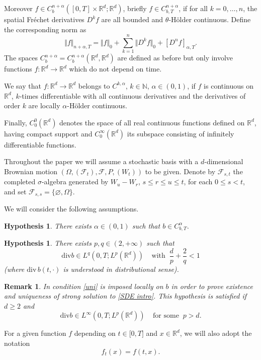 \documentclass[a4paper,10pt]{article}
\newtheorem{remark}[theorem]{Remark}
\newtheorem{hypothesis}[theorem]{Hypothesis}
\begin{document}
Moreover $f\in C_{b}^{n+{\alpha}}([0,T]\times{\mathbb{R}}^{d};{\mathbb{R}}%
^{d})$, briefly $f\in C_{b,T}^{n+{\alpha}}$, if for all
$k=0,\dots,n$, the spatial Fr\'echet derivatives $D^{k}f$ are all
bounded and $\theta$-H\"{o}lder continuous. Define the
corresponding norm as
\[
\Vert f\Vert_{n+\alpha,T}=\Vert f\Vert_{0}+\sum_{k=1}^{n}\Vert D^{k}f\Vert
_{0}+[D^{n}f]_{\alpha,T}.
\]
The spaces $C_{b}^{n+{\alpha}}=C_{b}^{n+{\alpha}}({\mathbb{R}}^{d}%
,{\mathbb{R}}^{d})$ are defined as before but only involve functions
$f:{\mathbb{R}}^{d}\rightarrow{\mathbb{R}}^{d}$ which do not depend on time.

We say  that $f: \mathbb{R} ^d \to \mathbb{R} ^d$ belongs to
$C^{k, \alpha}$, $k \in \mathbb N$, $\alpha \in (0,1)$, if $f$ is
continuous on $\mathbb{R} ^d$, $k$-times differentiable with all
continuous derivatives and  the derivatives of order $k$ are
locally $\alpha$-H\"older continuous.

Finally, $C^0_0(\mathbb{R} ^d)$ denotes the space of all real
continuous functions defined on $\mathbb{R} ^d$, having compact
support and $ C^{\infty}_0(\mathbb{R} ^d)$ its subspace consisting
of infinitely differentiable functions.



\vskip 1mm Throughout the paper we will assume a stochastic basis
with a $d$-dimensional Brownian motion $\left(  \Omega,\left(
\mathcal{F}{}_{t}\right) ,{}\mathcal{F},P,\left(  W_{t}\right)
\right)  $ to be given. Denote by $\mathcal{F}_{s,t}$ the
 completed
  $\sigma$-algebra generated by $W_{u}-W_{r}$, $s\leq r\leq u\leq
 t$,
 for each $0\le s<t$, and set $\mathcal{F}_{s,s} = \{ \varnothing, \Omega
  \}$.

We will consider the following assumptions.

\begin{hypothesis}
\label{hy1}
There exists ${\alpha}\in(0,1)$ such that $b\in C_{b,T}^{{\alpha}}$.
\end{hypothesis}

\begin{hypothesis}
\label{hy2}
There exists $p,  q \in (2, +\infty) $ such that
 \begin{equation} \label{uni}
{\mathrm{div}}b \in L^{q} (0,T; L^p(\mathbb{R} ^d))  \;\;\;\;
\text{with} \;\; \frac{d}{p} + \frac{2}{q} < 1
 \end{equation}
(where ${\mathrm{div}\,}b(t,\cdot)$ is understood in distributional sense).
\end{hypothesis}


 \begin{remark} In \cite{Kry-Ro} condition \eqref{uni}
 is imposed  locally on $b$ in order to prove existence and
 uniqueness of strong solution to \eqref{SDE intro}.
  This hypothesis     is satisfied
if $d \ge 2$ and
$$
{\mathrm{div}} b \in L^{\infty} (0,T; L^p(\mathbb{R} ^d))
\;\;\;\; \text{for some} \;\; p
>d.
$$
\end{remark}
For a given function $f$ depending on $t\in\lbrack0,T]$ and $x\in{\mathbb{R}%
}^{d}$, we will also adopt the  notation
\[
f_{t}(x)=f(t,x).
\]
\end{document}

